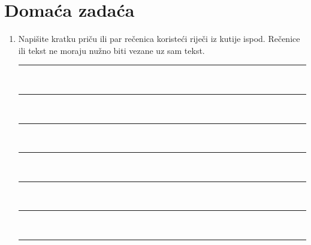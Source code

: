 \documentclass[a5paper, 10pt]{tekst}
\begin{document}
	\clearpage
	
	\section*{Domaća zadaća}
	\begin{enumerate}
		\item Napišite kratku priču ili par rečenica koristeći riječi iz kutije ispod.
		Rečenice ili tekst ne moraju nužno biti vezane uz sam tekst.
		\begin{center}
			\vspace{0.5em}
			\vspace{1.4em}
			\rule{\linewidth}{0.5pt}\\[0.6em]
			\rule{\linewidth}{0.5pt}\\[0.6em]
			\rule{\linewidth}{0.5pt}\\[0.6em]
			\rule{\linewidth}{0.5pt}\\[0.6em]
			\rule{\linewidth}{0.5pt}\\[0.6em]
			\rule{\linewidth}{0.5pt}\\[0.6em]
			\rule{\linewidth}{0.5pt}
		\end{center}
		

\end{enumerate}
\end{document}
